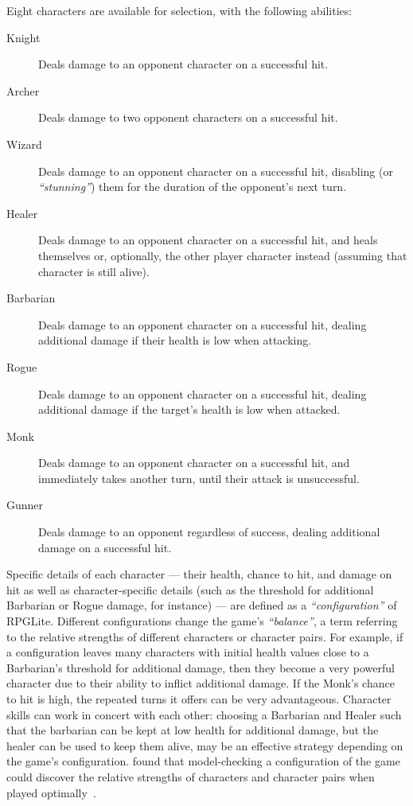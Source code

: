Eight characters are available for selection, with the following abilities:

\begin{description} \item[Knight] Deals damage to an opponent character on a
successful hit.  \item[Archer] Deals damage to two opponent characters on a
successful hit.  \item[Wizard] Deals damage to an opponent character on a
successful hit, disabling (or \emph{``stunning''}) them for the duration of the
opponent's next turn.  \item[Healer] Deals damage to an opponent character on a
successful hit, and heals themselves or, optionally, the other player character
instead (assuming that character is still alive).  \item[Barbarian] Deals damage
to an opponent character on a successful hit, dealing additional damage if their
health is low when attacking.  \item[Rogue] Deals damage to an opponent
character on a successful hit, dealing additional damage if the target's health
is low when attacked.  \item[Monk] Deals damage to an opponent character on a
successful hit, and immediately takes another turn, until their attack is
unsuccessful.  \item[Gunner] Deals damage to an opponent regardless of success,
dealing additional damage on a successful hit.  \end{description}

Specific details of each character --- their health, chance to hit, and damage
on hit as well as character-specific details (such as the threshold for
additional Barbarian or Rogue damage, for instance) --- are defined as a
\emph{``configuration''} of RPGLite. Different configurations change the game's
\emph{``balance''}, a term referring to the relative strengths of different
characters or character pairs. For example, if a configuration leaves many
characters with initial health values close to a Barbarian's threshold for
additional damage, then they become a very powerful character due to their
ability to inflict additional damage. If the Monk's chance to hit is high, the
repeated turns it offers can be very advantageous. Character skills can work in
concert with each other: choosing a Barbarian and Healer such that the barbarian
can be kept at low health for additional damage, but the healer can be used to
keep them alive, may be an effective strategy depending on the game's
configuration. \citeauthor{kavanagh2019balancing} found that model-checking a
configuration of the game could discover the relative strengths of characters
and character pairs when played optimally~\cite{kavanagh2019balancing}.


